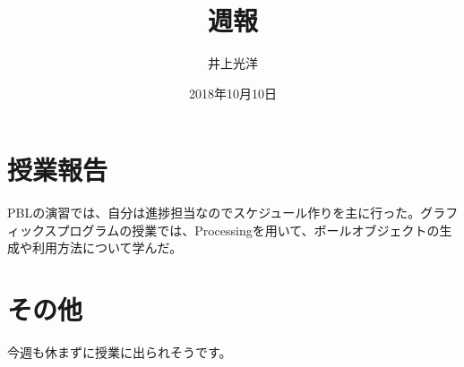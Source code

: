 \documentclass{jsarticle}
\title{週報}
\author{井上光洋}
\date{2018年10月10日}
\begin{document}
\maketitle

\section{授業報告}
PBLの演習では、自分は進捗担当なのでスケジュール作りを主に行った。グラフィックスプログラムの授業では、Processingを用いて、ボールオブジェクトの生成や利用方法について学んだ。

\section{その他}
今週も休まずに授業に出られそうです。
\end{document}

